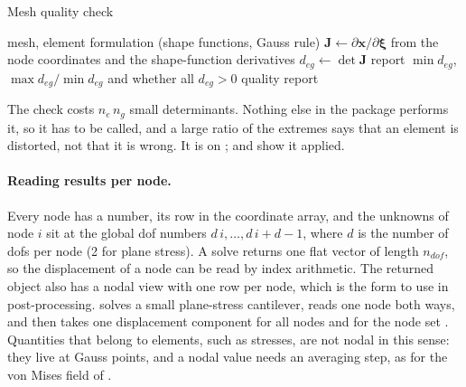 \begin{algbox}{Mesh quality check}
\begin{pseudo}
\Require mesh, element formulation (shape functions, Gauss rule)
  \State $\bm J\gets\partial\bm x/\partial\bm\xi$ from the node coordinates and the shape-function derivatives
  \State $d_{eg}\gets\det\bm J$
\EndFor
\State report $\min d_{eg}$, $\max d_{eg}/\min d_{eg}$ and whether all $d_{eg}>0$
\Ensure quality report
\end{pseudo}
\end{algbox}

The check costs $n_e\,n_g$ small determinants. Nothing else in the package performs it, so it has to be called, and a large ratio of the extremes says that an element is distorted, not that it is wrong. It is  on ;  and  show it applied.

\paragraph{Reading results per node.} Every node has a number, its row in the coordinate array, and the unknowns of node $i$ sit at the global dof numbers $d\,i,\dots,d\,i+d-1$, where $d$ is the number of dofs per node (2 for plane stress). A solve returns one flat vector of length $n_{dof}$, so the displacement of a node can be read by index arithmetic. The returned object also has a nodal view with one row per node, which is the form to use in post-processing.  solves a small plane-stress cantilever, reads one node both ways, and then takes one displacement component for all nodes and for the node set . Quantities that belong to elements, such as stresses, are not nodal in this sense: they live at Gauss points, and a nodal value needs an averaging step, as for the von Mises field of .

